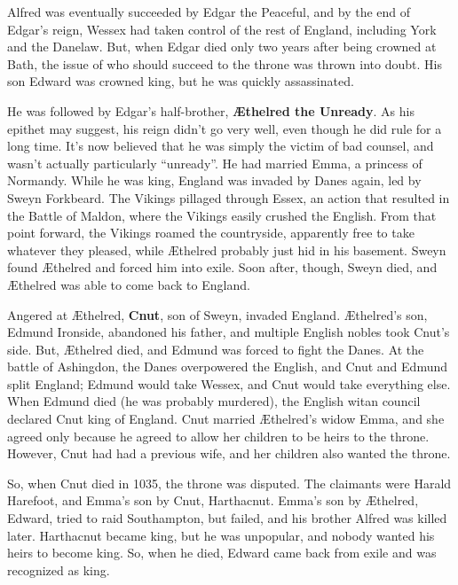 Alfred was eventually succeeded by Edgar the Peaceful, and by the end of Edgar's reign,
Wessex had taken control of the rest of England, including York and the Danelaw.
But, when Edgar died only two years after being crowned at Bath,
the issue of who should succeed to the throne was thrown into doubt.
His son Edward was crowned king, but he was quickly assassinated.

He was followed by Edgar's half-brother, \textbf{\AE{}thelred the Unready}.
As his epithet may suggest, his reign didn't go very well, even though he did rule for a long time.
It's now believed that he was simply the victim of bad counsel, and wasn't actually particularly ``unready''.
He had married Emma, a princess of Normandy.
While he was king, England was invaded by Danes again, led by Sweyn Forkbeard.
The Vikings pillaged through Essex, an action that resulted in the Battle of Maldon,
where the Vikings easily crushed the English.
From that point forward, the Vikings roamed the countryside, apparently free to take whatever they pleased,
while \AE{}thelred probably just hid in his basement.
Sweyn found \AE{}thelred and forced him into exile.
Soon after, though, Sweyn died, and \AE{}thelred was able to come back to England.

Angered at \AE{}thelred, \textbf{Cnut}, son of Sweyn, invaded England.
\AE{}thelred's son, Edmund Ironside, abandoned his father, and multiple English nobles took Cnut's side.
But, \AE{}thelred died, and Edmund was forced to fight the Danes.
At the battle of Ashingdon, the Danes overpowered the English, and Cnut and Edmund split England;
Edmund would take Wessex, and Cnut would take everything else.
When Edmund died (he was probably murdered), the English witan council declared Cnut king of England.
Cnut married \AE{}thelred's widow Emma,
and she agreed only because he agreed to allow her children to be heirs to the throne.
However, Cnut had had a previous wife, and her children also wanted the throne.

So, when Cnut died in 1035, the throne was disputed.
The claimants were Harald Harefoot, and Emma's son by Cnut, Harthacnut.
Emma's son by \AE{}thelred, Edward, tried to raid Southampton, but failed, and his brother Alfred was killed later.
Harthacnut became king, but he was unpopular, and nobody wanted his heirs to become king.
So, when he died, Edward came back from exile and was recognized as king.

